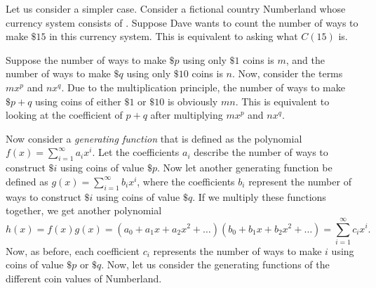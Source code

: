 Let us consider a simpler case. Consider a fictional country Numberland whose currency system consists of \NTen. Suppose Dave wants to count the number of ways to make  $\$ 15$ in this currency system. This is equivalent to asking what $C(15)$ is.

Suppose the number of ways to make $\$ p$ using only $\$ 1$ coins is $m$, and the number of ways to make $\$ q$ using only $\$ 10$ coins is $n$. Now, consider the terms $mx^{p}$ and $nx^{q}$. Due to the multiplication principle, the number of ways to make $\$ p+q$ using coins of either $\$ 1$ or $\$ 10$ is obviously $mn$. This is equivalent to looking at the coefficient of $p+q$ after multiplying $mx^{p}$ and $nx^{q}$.

Now consider a \emph{generating function} that is defined as the polynomial $f(x) = \sum_{i=1}^{\infty} a_i x^i$. Let the coefficients $a_i$ describe the number of ways to construct $\$ i$ using coins of value $\$ p$. Now let another generating function be defined as $g(x) = \sum_{i=1}^{\infty} b_i x^i$, where the coefficients $b_i$ represent the number of ways to construct $\$ i$ using coins of value $\$ q$. If we multiply these functions together, we get another polynomial \[
  h(x) = f(x)g(x) = (a_0 + a_1x + a_2x^2 + \dots)(b_0 + b_1x + b_2x^2 + \dots) = \sum_{i=1}^{\infty} c_ix^{i}
.\] Now, as before, each coefficient $c_i$ represents the number of ways to make $i$ using coins of value $\$ p$ or $\$ q$. Now, let us consider the generating functions of the different coin values of Numberland.

